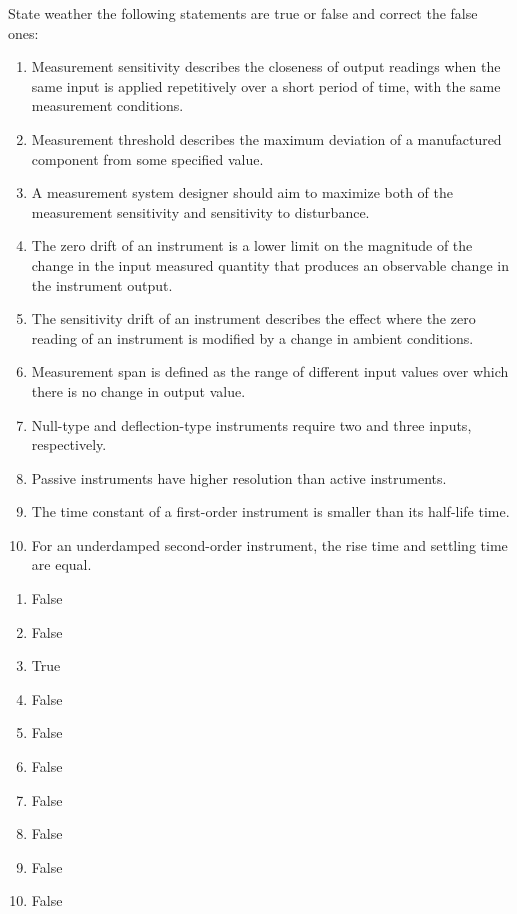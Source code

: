 \documentclass[a4paper,11pt,dvipsnames]{book}
\begin{document}
\begin{question}
State weather the following statements are true or false and correct the false ones:
\begin{enumerate}
\item  Measurement sensitivity describes the closeness of output readings when the same input is applied repetitively over a short period of time, with the same measurement conditions.
\item  Measurement threshold describes the maximum deviation of a manufactured component from some specified value.
\item A measurement system designer should aim to maximize both of the measurement sensitivity and sensitivity to disturbance.
\item The zero drift of an instrument is a lower limit on the magnitude of the change in the input measured quantity that produces an observable change in the instrument output.
\item The sensitivity drift of an instrument describes the effect where the zero reading of an instrument is modified by a change in ambient conditions.
\item Measurement span is defined as the range of different input values over which there is no change in output value.
\item Null-type and deflection-type instruments require two and three inputs, respectively.
\item Passive instruments have higher resolution than active instruments.
\item  The time constant of a first-order instrument is smaller than its half-life time.
\item  For an underdamped second-order instrument, the rise time and settling time are equal.
\end{enumerate}
\end{question}
\begin{solution}
\begin{enumerate}
\item False
\item False
\item True
\item False
\item False
\item False
\item False
\item False
\item False
\item False
\end{enumerate}

\end{solution}
\end{document}
